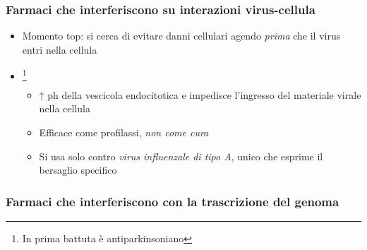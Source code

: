 \documentclass[italian,]{article}
\providecommand{\tightlist}{%
  \setlength{\itemsep}{0pt}\setlength{\parskip}{0pt}}
\newcommand{\far}[1]{ \fbox{\textsc{#1}} } %
\begin{document}
\hypertarget{farmaci-che-interferiscono-su-interazioni-virus-cellula}{%
\subsubsection{Farmaci che interferiscono su interazioni
virus-cellula}\label{farmaci-che-interferiscono-su-interazioni-virus-cellula}}

\begin{itemize}
\tightlist
\item
  Momento top: si cerca di evitare danni cellulari agendo \emph{prima}
  che il virus entri nella cellula
\item
  \far{amantidina}\footnote{In prima battuta è antiparkinsoniano}

  \begin{itemize}
  \tightlist
  \item
    ↑ ph della vescicola endocitotica e impedisce l'ingresso del
    materiale virale nella cellula
  \item
    Efficace come profilassi, \emph{non come cura}
  \item
    Si usa solo contro \emph{virus influenzale di tipo A}, unico che
    esprime il bersaglio specifico
  \end{itemize}
\end{itemize}

\hypertarget{farmaci-che-interferiscono-con-la-trascrizione-del-genoma}{%
\subsubsection{Farmaci che interferiscono con la trascrizione del
genoma}\label{farmaci-che-interferiscono-con-la-trascrizione-del-genoma}}
\end{document}
